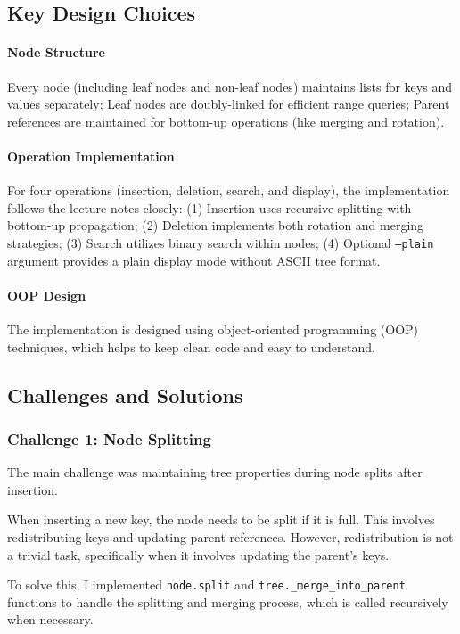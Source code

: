 \documentclass[11pt]{article}
\begin{document}
\subsection{Key Design Choices}

\paragraph{Node Structure} Every node (including leaf nodes and non-leaf nodes) maintains lists for keys and values separately; Leaf nodes are doubly-linked for efficient range queries; Parent references are maintained for bottom-up operations (like merging and rotation).

\paragraph{Operation Implementation} For four operations (insertion, deletion, search, and display), the implementation follows the lecture notes closely: (1) Insertion uses recursive splitting with bottom-up propagation; (2) Deletion implements both rotation and merging strategies; (3) Search utilizes binary search within nodes; (4) Optional \texttt{--plain} argument provides a plain display mode without ASCII tree format.

\paragraph{OOP Design} The implementation is designed using object-oriented programming (OOP) techniques, which helps to keep clean code and easy to understand.

\subsection{Challenges and Solutions}

\subsubsection{Challenge 1: Node Splitting}
The main challenge was maintaining tree properties during node splits after insertion. 

When inserting a new key, the node needs to be split if it is full. This involves redistributing keys and updating parent references. However, redistribution is not a trivial task, specifically when it involves updating the parent's keys. 

To solve this, I implemented \texttt{node.split} and \texttt{tree.\_merge\_into\_parent} functions to handle the splitting and merging process, which is called recursively when necessary.
\end{document}
